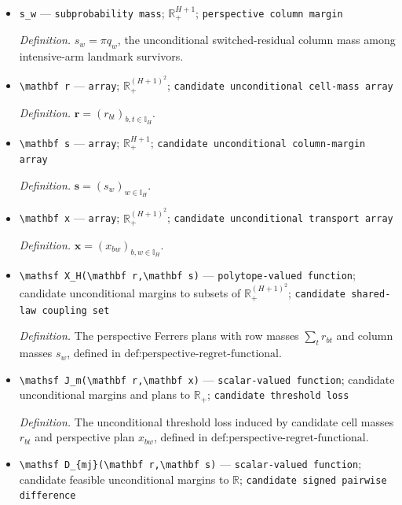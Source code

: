 \documentclass{article}
\begin{document}
\begin{itemize}
  \item \texttt{s\_\allowbreak{}w} --- \texttt{subprobability mass}; \(\mathbb R_+^{H+1}\); \texttt{perspective column margin}
  \par\smallskip\noindent\emph{Definition.} \(s_w=\pi q_w\), the unconditional switched-residual column mass among intensive-arm landmark survivors.
  \item \texttt{\textbackslash{}\allowbreak{}mathbf r} --- \texttt{array}; \(\mathbb R_+^{(H+1)^2}\); \texttt{candidate unconditional cell-\allowbreak{}mass array}
  \par\smallskip\noindent\emph{Definition.} \(\mathbf r=(r_{bt})_{b,t\in\mathbb I_H}\).
  \item \texttt{\textbackslash{}\allowbreak{}mathbf s} --- \texttt{array}; \(\mathbb R_+^{H+1}\); \texttt{candidate unconditional column-\allowbreak{}margin array}
  \par\smallskip\noindent\emph{Definition.} \(\mathbf s=(s_w)_{w\in\mathbb I_H}\).
  \item \texttt{\textbackslash{}\allowbreak{}mathbf x} --- \texttt{array}; \(\mathbb R_+^{(H+1)^2}\); \texttt{candidate unconditional transport array}
  \par\smallskip\noindent\emph{Definition.} \(\mathbf x=(x_{bw})_{b,w\in\mathbb I_H}\).
  \item \texttt{\textbackslash{}\allowbreak{}mathsf X\_\allowbreak{}H(\textbackslash{}\allowbreak{}mathbf r,\allowbreak{}\textbackslash{}\allowbreak{}mathbf s)} --- \texttt{polytope-\allowbreak{}valued function}; candidate unconditional margins to subsets of \(\mathbb R_+^{(H+1)^2}\); \texttt{candidate shared-\allowbreak{}law coupling set}
  \par\smallskip\noindent\emph{Definition.} The perspective Ferrers plans with row masses \(\sum_t r_{bt}\) and column masses \(s_w\), defined in \(\text{def:perspective-regret-functional}\).
  \item \texttt{\textbackslash{}\allowbreak{}mathsf J\_\allowbreak{}m(\textbackslash{}\allowbreak{}mathbf r,\allowbreak{}\textbackslash{}\allowbreak{}mathbf x)} --- \texttt{scalar-\allowbreak{}valued function}; candidate unconditional margins and plans to \(\mathbb R_+\); \texttt{candidate threshold loss}
  \par\smallskip\noindent\emph{Definition.} The unconditional threshold loss induced by candidate cell masses \(r_{bt}\) and perspective plan \(x_{bw}\), defined in \(\text{def:perspective-regret-functional}\).
  \item \texttt{\textbackslash{}\allowbreak{}mathsf D\_\allowbreak{}\{mj\}\allowbreak{}(\textbackslash{}\allowbreak{}mathbf r,\allowbreak{}\textbackslash{}\allowbreak{}mathbf s)} --- \texttt{scalar-\allowbreak{}valued function}; candidate feasible unconditional margins to \(\mathbb R\); \texttt{candidate signed pairwise difference}

\end{itemize}
\end{document}
